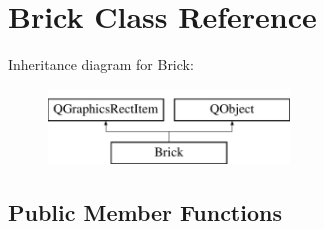 \hypertarget{class_brick}{\section{Brick Class Reference}
\label{class_brick}
}
Inheritance diagram for Brick\+:\begin{figure}[H]
\begin{center}
\leavevmode
\includegraphics[height=2.000000cm]{class_brick}
\end{center}
\end{figure}
\subsection*{Public Member Functions}
